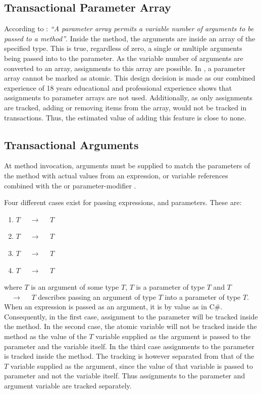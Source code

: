 \subsection{Transactional Parameter Array}\label{sec:stm_design_paramter_array}
According to \cite[p. 17]{csharp2013specificaiton}: \textit{``A parameter array permits a variable number of arguments to be passed to a method''}. Inside the method, the arguments are inside an array of the specified type. This is true, regardless of zero, a single or multiple arguments being passed into to the parameter. As the variable number of arguments are converted to an array, assignments to this array are possible. In \stmname, a parameter array cannot be marked as atomic. This design decision is made as our combined experience of 18 years educational and professional experience shows that assignments to parameter arrays are not used. Additionally, as only assignments are tracked, adding or removing items from the array, would not be tracked in transactions. Thus, the estimated value of adding this feature is close to none.

\subsection{Transactional Arguments}
At method invocation, arguments must be supplied to match the parameters of the method with actual values from an expression, or variable references combined with the  or  parameter-modifier \cite[p. 144]{csharp2013specificaiton}.

Four different cases exist for passing expressions,  and  parameters. These are:
\begin{enumerate}
	\item $T$ $\quad \rightarrow \quad$  $T$
	\item {} $T$ $\quad \rightarrow\quad$ $T$
	\item {} $T$ $\quad \rightarrow\quad$  $T$
	\item $T$ $\quad \rightarrow \quad$ $T$
\end{enumerate} 
where $T$ is an argument of some type $T$,  $T$ is a  parameter of type $T$ and $T$ $\quad \rightarrow \quad$  $T$ describes passing an argument of type $T$ into a  parameter of type $T$. When an expression is passed as an argument, it is by value as in C\#. Consequently, in the first case, assignment to the parameter will be tracked inside the method. In the second case, the atomic variable will not be tracked inside the method as the value of the  $T$ variable supplied as the argument is passed to the parameter and the variable itself. In the third case assignments to the  parameter is tracked inside the method. The tracking is however separated from that of the  $T$ variable supplied as the argument, since the value of that variable is passed to parameter and not the variable itself. Thus assignments to the parameter and argument variable are tracked separately. 

